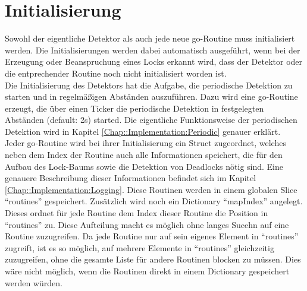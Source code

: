 \section{Initialisierung} \label{Chap::Implementation:Initialisierung}
Sowohl der eigentliche Detektor als auch jede neue go-Routine muss initialisiert 
werden. Die Initialisierungen werden dabei automatisch ausgeführt, wenn bei der 
Erzeugung oder Beanspruchung eines Locks erkannt wird, dass der Detektor oder 
die entprechender Routine noch nicht initialisiert worden ist.\\
Die Initialisierung des Detektors hat
die Aufgabe, die periodische Detektion zu starten und in regelmäßigen 
Abständen auszuführen. Dazu wird eine go-Routine erzeugt, die über einen Ticker
die periodische Detektion in festgelegten Abständen (default: 2s) started. Die
eigentliche Funktionsweise der periodischen Detektion wird in Kapitel 
\ref{Chap::Implementation:Periodic} genauer erklärt.\\
Jeder go-Routine wird bei ihrer Initialisierung ein
Struct zugeordnet, welches neben dem Index der Routine auch alle Informationen 
speichert, die für den Aufbau des Lock-Baums sowie die Detektion von Deadlocks 
nötig sind. Eine genauere 
Beschreibung dieser Informationen befindet sich im Kapitel 
\ref{Chap::Implementation:Logging}. Diese Routinen werden in einem globalen 
Slice ``routines'' gespeichert. Zusätzlich wird noch ein Dictionary ``mapIndex'' 
angelegt. Dieses ordnet für jede Routine dem Index dieser Routine die Position
in ``routines'' zu. 
Diese Aufteilung macht es möglich ohne langes Sucehn auf eine Routine
zuzugreifen. Da jede Routine nur auf sein eigenes Element in 
``routines'' zugreift, ist es so möglich, auf mehrere Elemente in ``routines''
gleichzeitig zuzugreifen, ohne die gesamte Liste für andere Routinen blocken zu 
müssen. Dies wäre nicht möglich, wenn die Routinen direkt in einem Dictionary
gespeichert werden würden.



